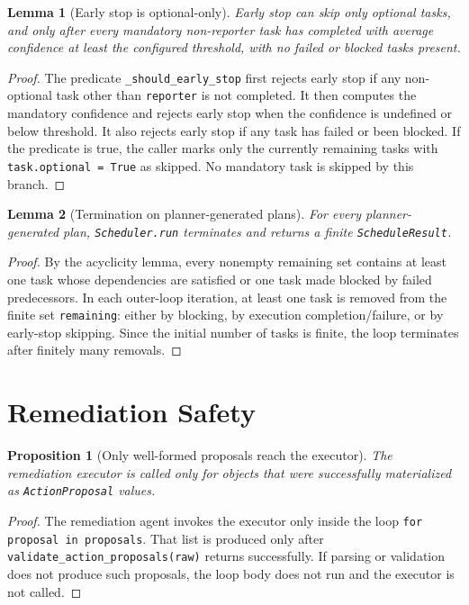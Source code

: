 \documentclass[11pt]{article}
\newtheorem{lemma}{Lemma}
\newtheorem{proposition}{Proposition}
\theoremstyle{definition}
\begin{document}
\begin{lemma}[Early stop is optional-only]
Early stop can skip only optional tasks, and only after every mandatory non-reporter task has
completed with average confidence at least the configured threshold, with no failed or blocked
tasks present.
\end{lemma}

\begin{proof}
The predicate \texttt{\_should\_early\_stop} first rejects early stop if any non-optional task
other than \texttt{reporter} is not completed. It then computes the mandatory confidence and
rejects early stop when the confidence is undefined or below threshold. It also rejects early
stop if any task has failed or been blocked. If the predicate is true, the caller marks only
the currently remaining tasks with \texttt{task.optional = True} as skipped. No mandatory task
is skipped by this branch.
\end{proof}

\begin{lemma}[Termination on planner-generated plans]
For every planner-generated plan, \texttt{Scheduler.run} terminates and returns a finite
\texttt{ScheduleResult}.
\end{lemma}

\begin{proof}
By the acyclicity lemma, every nonempty remaining set contains at least one task whose
dependencies are satisfied or one task made blocked by failed predecessors. In each outer-loop
iteration, at least one task is removed from the finite set \texttt{remaining}: either by
blocking, by execution completion/failure, or by early-stop skipping. Since the initial number
of tasks is finite, the loop terminates after finitely many removals.
\end{proof}

\section{Remediation Safety}
\begin{proposition}[Only well-formed proposals reach the executor]
The remediation executor is called only for objects that were successfully materialized as
\texttt{ActionProposal} values.
\end{proposition}

\begin{proof}
The remediation agent invokes the executor only inside the loop
\texttt{for proposal in proposals}. That list is produced only after
\texttt{validate\_action\_proposals(raw)} returns successfully. If parsing or validation does not
produce such proposals, the loop body does not run and the executor is not called.
\end{proof}
\end{document}
